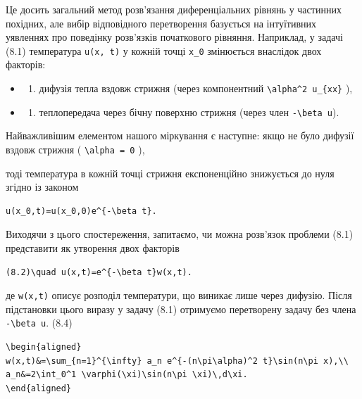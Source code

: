 \documentclass[
  ukrainian,
]{article}
\providecommand{\tightlist}{%
  \setlength{\itemsep}{0pt}\setlength{\parskip}{0pt}}
\begin{document}
Це досить загальний метод розв'язання диференціальних рівнянь у
частинних похідних, але вибір відповідного перетворення базується на
інтуїтивних уявленнях про поведінку розв'язків початкового рівняння.
Наприклад, у задачі (8.1) температура \texttt{u(x,\ t)} у кожній точці
\texttt{x\_0} змінюється внаслідок двох факторів:

\begin{itemize}
\tightlist
\item
  \begin{enumerate}
  \def\labelenumi{\arabic{enumi})}
  \tightlist
  \item
    дифузія тепла вздовж стрижня (через компонентний
    \texttt{\textbackslash{}alpha\^{}2\ u\_\{xx\}} ),
  \end{enumerate}
\item
  \begin{enumerate}
  \def\labelenumi{\arabic{enumi})}
  \setcounter{enumi}{1}
  \tightlist
  \item
    теплопередача через бічну поверхню стрижня (через член
    \texttt{-\textbackslash{}beta\ u}).
  \end{enumerate}
\end{itemize}

Найважливішим елементом нашого міркування є наступне: якщо не було
дифузії вздовж стрижня ( \texttt{\textbackslash{}alpha\ =\ 0} ),

тоді температура в кожній точці стрижня експоненційно знижується до нуля
згідно із законом

\begin{verbatim}
u(x_0,t)=u(x_0,0)e^{-\beta t}.
\end{verbatim}

Виходячи з цього спостереження, запитаємо, чи можна розв'язок проблеми
(8.1) представити як утворення двох факторів

\begin{verbatim}
(8.2)\quad u(x,t)=e^{-\beta t}w(x,t).
\end{verbatim}

де \texttt{w(x,t)} описує розподіл температури, що виникає лише через
дифузію. Після підстановки цього виразу у задачу (8.1) отримуємо
перетворену задачу без члена \texttt{-\textbackslash{}beta\ u}. (8.4)

\begin{verbatim}
\begin{aligned}
w(x,t)&=\sum_{n=1}^{\infty} a_n e^{-(n\pi\alpha)^2 t}\sin(n\pi x),\\
a_n&=2\int_0^1 \varphi(\xi)\sin(n\pi \xi)\,d\xi.
\end{aligned}
\end{verbatim}
\end{document}
